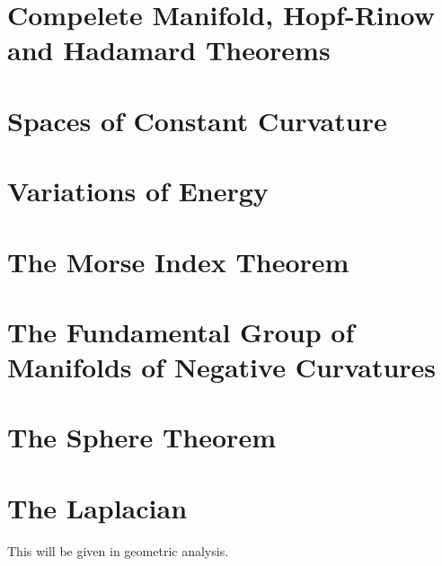\documentclass[Total.tex]{subfiles}
\begin{document}
	\chapter{Compelete Manifold, Hopf-Rinow and Hadamard Theorems}
	\chapter{Spaces of Constant Curvature}
	\chapter{Variations of Energy}
	\chapter{The Morse Index Theorem}
	\chapter{The Fundamental Group of Manifolds of Negative Curvatures}
	\chapter{The Sphere Theorem}
	\chapter{The Laplacian}
		This will be given in geometric analysis.
\end{document}
